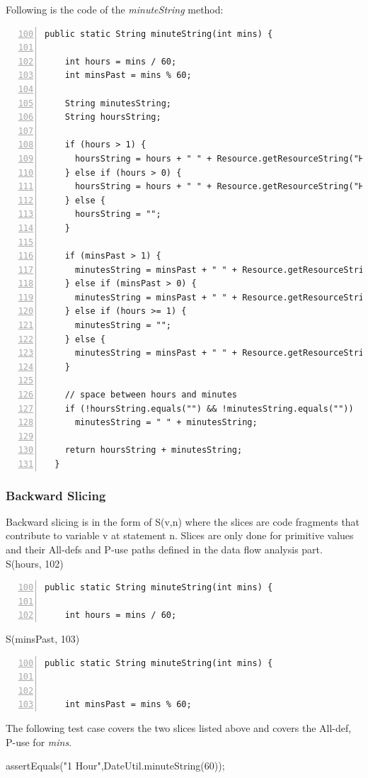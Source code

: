 \documentclass[fontsize=12pt,paper=letter,twoside]{scrartcl}
\begin{document}
\noindent Following is the code of the \emph{minuteString} method:
\begin{lstlisting}[numbers=left,firstnumber=100]
  public static String minuteString(int mins) {
    
    int hours = mins / 60;
    int minsPast = mins % 60;
    
    String minutesString;
    String hoursString;
    
    if (hours > 1) {
      hoursString = hours + " " + Resource.getResourceString("Hours");
    } else if (hours > 0) {
      hoursString = hours + " " + Resource.getResourceString("Hour");
    } else {
      hoursString = "";
    }

    if (minsPast > 1) {
      minutesString = minsPast + " " + Resource.getResourceString("Minutes");
    } else if (minsPast > 0) {
      minutesString = minsPast + " " + Resource.getResourceString("Minute");
    } else if (hours >= 1) {
      minutesString = "";
    } else {
      minutesString = minsPast + " " + Resource.getResourceString("Minutes");
    }

    // space between hours and minutes
    if (!hoursString.equals("") && !minutesString.equals(""))
      minutesString = " " + minutesString;

    return hoursString + minutesString;
  }
\end{lstlisting}

\subsubsection{Backward Slicing}
Backward slicing is in the form of S(v,n) where the slices are code fragments that contribute to variable v at statement n. Slices are only done for primitive values and their All-defs and P-use paths defined in the data flow analysis part.\\

S(hours, 102)
\begin{lstlisting}[numbers=left,firstnumber=100]
  public static String minuteString(int mins) {
    
    int hours = mins / 60;
\end{lstlisting}  


S(minsPast, 103)
\begin{lstlisting}[numbers=left,firstnumber=100]
  public static String minuteString(int mins) {
    
    
    int minsPast = mins % 60;
\end{lstlisting} 
The following test case covers the two slices listed above and covers the All-def, P-use for \emph{mins}.
\begin{code}
  assertEquals("1 Hour",DateUtil.minuteString(60));
\end{code}
\end{document}
